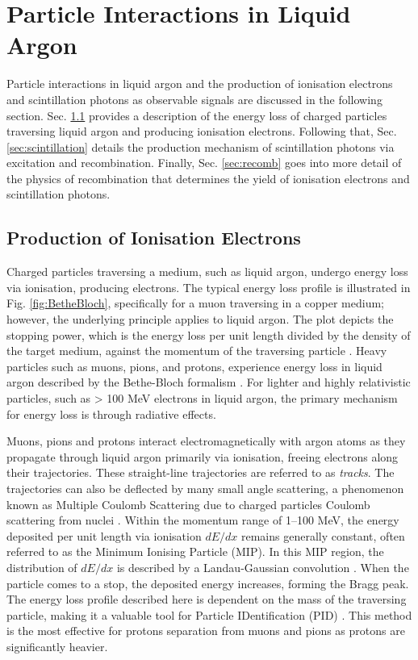 \section{Particle Interactions in Liquid Argon}
\label{sec3:creation}

Particle interactions in liquid argon and the production of ionisation electrons and scintillation photons as observable signals are discussed in the following section.       
Sec. \ref{sec3:bethebloch} provides a description of the energy loss of charged particles traversing liquid argon and producing ionisation electrons.                          
Following that, Sec. \ref{sec:scintillation} details the production mechanism of scintillation photons via excitation and recombination.                                       
Finally, Sec. \ref{sec:recomb} goes into more detail of the physics of recombination that determines the yield of ionisation electrons and scintillation photons.

\subsection{Production of Ionisation Electrons}
\label{sec3:bethebloch}

Charged particles traversing a medium, such as liquid argon, undergo energy loss via ionisation, producing electrons.                                                                       
The typical energy loss profile is illustrated in Fig. \ref{fig:BetheBloch}, specifically for a muon traversing in a copper medium; however, the underlying principle applies to liquid argon.
The plot depicts the stopping power, which is the energy loss per unit length divided by the density of the target medium, against the momentum of the traversing particle \cite{Passage}.
Heavy particles such as muons, pions, and protons, experience energy loss in liquid argon described by the Bethe-Bloch formalism \cite{Passage}.
For lighter and highly relativistic particles, such as > 100 MeV electrons in liquid argon, the primary mechanism for energy loss is through radiative effects.

Muons, pions and protons interact electromagnetically with argon atoms as they propagate through liquid argon primarily via ionisation, freeing electrons along their trajectories.
These straight-line trajectories are referred to as \textit{tracks}.
The trajectories can also be deflected by many small angle scattering, a phenomenon known as Multiple Coulomb Scattering due to charged particles Coulomb scattering from nuclei \cite{Passage}. 
Within the momentum range of 1--100 MeV, the energy deposited per unit length via ionisation $dE/dx$ remains generally constant, often referred to as the Minimum Ionising Particle (MIP).
In this MIP region, the distribution of $dE/dx$ is described by a Landau-Gaussian convolution \cite{Passage}. 
When the particle comes to a stop, the deposited energy increases, forming the Bragg peak.
The energy loss profile described here is dependent on the mass of the traversing particle, making it a valuable tool for Particle IDentification (PID) \cite{argoneut}.
This method is the most effective for protons separation from muons and pions as protons are significantly heavier.


